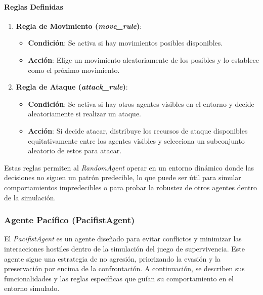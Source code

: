 \documentclass[11pt]{article}
\begin{document}
\paragraph{Reglas Definidas}
\begin{enumerate}
    \item \textbf{Regla de Movimiento (\textit{move\_rule})}:
          \begin{itemize}
              \item \textbf{Condición}: Se activa si hay movimientos posibles disponibles.
              \item \textbf{Acción}: Elige un movimiento aleatoriamente de los posibles y lo establece como el próximo movimiento.
          \end{itemize}
    \item \textbf{Regla de Ataque (\textit{attack\_rule})}:
          \begin{itemize}
              \item \textbf{Condición}: Se activa si hay otros agentes visibles en el entorno y decide aleatoriamente si realizar un ataque.
              \item \textbf{Acción}: Si decide atacar, distribuye los recursos de ataque disponibles equitativamente entre los agentes visibles y selecciona un subconjunto aleatorio de estos para atacar.
          \end{itemize}
\end{enumerate}

Estas reglas permiten al \textit{RandomAgent} operar en un entorno dinámico donde las decisiones no siguen un patrón predecible, lo que puede ser útil para simular comportamientos impredecibles o para probar la robustez de otros agentes dentro de la simulación.

\subsubsection{Agente Pacífico (PacifistAgent)}
El \textit{PacifistAgent} es un agente diseñado para evitar conflictos y minimizar las interacciones hostiles dentro de la simulación del juego de supervivencia. Este agente sigue una estrategia de no agresión, priorizando la evasión y la preservación por encima de la confrontación. A continuación, se describen sus funcionalidades y las reglas específicas que guían su comportamiento en el entorno simulado.
\end{document}
